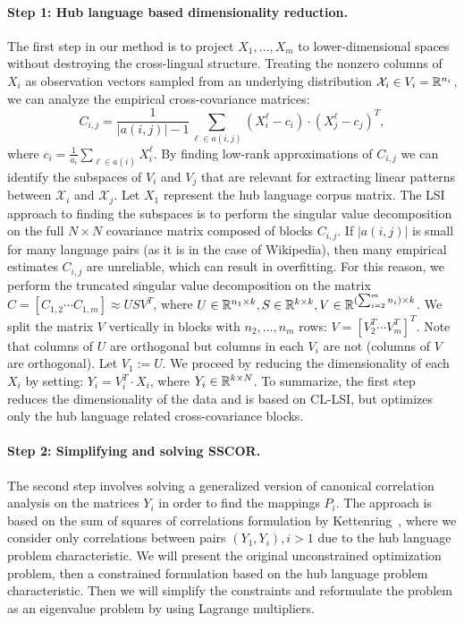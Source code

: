 \paragraph{Step 1: Hub language based dimensionality reduction.}
The first step in our method is to project $X_1, \ldots, X_m$ to lower-dimensional spaces 
without destroying the cross-lingual structure. Treating the nonzero columns of $X_i$ as 
observation vectors sampled from an underlying distribution $\mathcal{X}_i \in V_i = \mathbb{R}^{n_i}$, 
we can analyze the empirical cross-covariance matrices:
$$C_{i,j} = \frac{1}{|a(i,j)|-1 }\sum_{\ell \in a(i,j)} (X_i^{\ell} - c_i)\cdot (X_j^{\ell} - c_j)^T,$$
 where $c_i = \frac{1}{a_i} \sum_{\ell \in a(i)}X_i^{\ell}$. By finding low-rank 
 approximations of $C_{i,j}$ we can identify the subspaces of $V_i$ and $V_j$ that are 
 relevant for extracting linear patterns between $\mathcal{X}_i$ and $\mathcal{X}_j$. 
 Let $X_1$ represent the hub language corpus matrix. The LSI approach to finding the subspaces 
 is to perform the singular value decomposition on the full $N \times N$ covariance matrix 
 composed of blocks $C_{i,j}$. If $|a(i,j)|$ is small for many language pairs (as it is in the 
 case of Wikipedia), then many empirical estimates $C_{i,j}$ are unreliable, which can result 
 in overfitting. For this reason, we perform the truncated singular value decomposition on the 
 matrix $C = [C_{1,2}  \cdots  C_{1,m}] \approx U S V^T$, where 
 $U \in \mathbb{R}^{n_1 \times k}, S \in \mathbb{R}^{k \times k}, V \in \mathbb{R}^{(\sum_{i=2}^m n_i) \times k}$. 
 We split the matrix $V$ vertically in blocks with 
 $n_2, \ldots, n_m$ rows: $V = [V_2^T  \cdots  V_m^T]^T$. 
 Note that columns of $U$ are orthogonal but columns in each $V_i$ are not (columns of $V$ 
 are orthogonal). Let $V_1 := U$. We proceed by reducing the dimensionality of each $X_i$ by 
 setting: $Y_i = V_i^T \cdot X_i$, where $Y_i \in \mathbb{R}^{k\times N}$. To summarize, the first step 
 reduces the dimensionality of the data and is based on CL-LSI, but optimizes only the hub language 
 related cross-covariance blocks.

\paragraph{Step 2: Simplifying and solving SSCOR.}
The second step involves solving a generalized version of canonical correlation analysis on the 
matrices $Y_i$ in order to find the mappings $P_i$. The approach is based on the sum of 
squares of correlations formulation by Kettenring~\cite{Kettenring}, where we consider only 
correlations between pairs $(Y_1, Y_i), i >1$ due to the hub language problem characteristic.
We will present the original unconstrained optimization problem, then a constrained formulation 
based on the hub language problem characteristic. Then we will simplify the constraints and 
reformulate the problem as an eigenvalue problem by using Lagrange multipliers.

